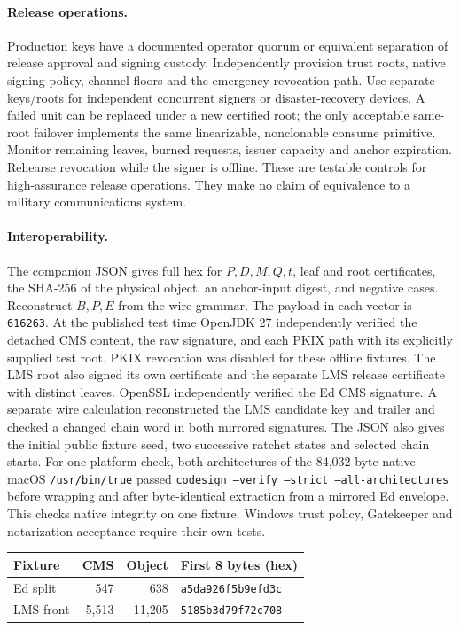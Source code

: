\documentclass[10pt,twocolumn,letterpaper]{article}
\begin{document}
\paragraph{Release operations.}
Production keys have a documented operator quorum or equivalent separation of release approval and signing custody. Independently provision trust roots, native signing policy, channel floors and the emergency revocation path. Use separate keys/roots for independent concurrent signers or disaster-recovery devices. A failed unit can be replaced under a new certified root; the only acceptable same-root failover implements the same linearizable, nonclonable consume primitive. Monitor remaining leaves, burned requests, issuer capacity and anchor expiration. Rehearse revocation while the signer is offline. These are testable controls for high-assurance release operations. They make no claim of equivalence to a military communications system.

\paragraph{Interoperability.}
The companion JSON gives full hex for $P,D,M,Q,t$, leaf and root certificates, the SHA-256 of the physical object, an anchor-input digest, and negative cases. Reconstruct $B,P,E$ from the wire grammar. The payload in each vector is \texttt{616263}. At the published test time OpenJDK 27 independently verified the detached CMS content, the raw signature, and each PKIX path with its explicitly supplied test root. PKIX revocation was disabled for these offline fixtures. The LMS root also signed its own certificate and the separate LMS release certificate with distinct leaves. OpenSSL independently verified the Ed CMS signature. A separate wire calculation reconstructed the LMS candidate key and trailer and checked a changed chain word in both mirrored signatures. The JSON also gives the initial public fixture seed, two successive ratchet states and selected chain starts. For one platform check, both architectures of the 84,032-byte native macOS \texttt{/usr/bin/true} passed \texttt{codesign --verify --strict --all-architectures} before wrapping and after byte-identical extraction from a mirrored Ed envelope. This checks native integrity on one fixture. Windows trust policy, Gatekeeper and notarization acceptance require their own tests.
\begin{center}\small
\setlength{\tabcolsep}{3pt}\begin{tabular}{@{}lrrl@{}}
\toprule
Fixture & CMS & Object & First 8 bytes (hex)\\
\midrule
Ed split & 547 & 638 & \texttt{a5da926f5b9efd3c}\\
LMS front & 5,513 & 11,205 & \texttt{5185b3d79f72c708}\\
\bottomrule
\end{tabular}
\end{center}
\end{document}
